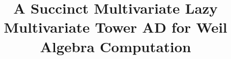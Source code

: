 \usepackage{amsmath,amssymb}
\usepackage{stmaryrd}
\usepackage{graphicx}
\usepackage{subfiles}

\usepackage{pgfplots}
\usepackage[backend=biber,bibstyle=numeric]{biblatex}


\title{A Succinct Multivariate Lazy Multivariate Tower AD for Weil Algebra Computation}
\newcommand{\Rseries}{\R\llbracket\boldsymbol{X}\rrbracket}
\date{}
